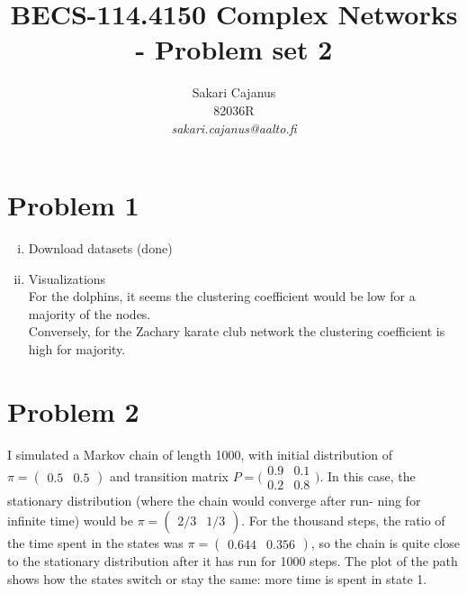 \documentclass[a4paper]{article}
\title{ BECS-114.4150 Complex Networks - Problem set 2}
\author{Sakari Cajanus\\ 82036R \\
       {\it sakari.cajanus@aalto.fi}}
\begin{document}
\maketitle


\newpage

\section*{Problem 1}
\begin{enumerate}[i)]
    \item Download datasets (done)
    \item Visualizations\\
        For the dolphins, it seems the clustering coefficient would be low for a majority of the nodes.\\
        Conversely, for the Zachary karate club network the clustering coefficient is high for majority.

        
\end{enumerate}
\clearpage
\section*{Problem 2}
I simulated a Markov chain of length 1000, with initial distribution of
$\pi = (\begin{smallmatrix} 0.5 & 0.5\end{smallmatrix})$ and transition matrix  $P = \bigl(\begin{smallmatrix} 0.9 &
0.1 \\ 0.2 & 0.8\end{smallmatrix}\bigr)$.
In this case, the stationary distribution (where the chain would converge after run-
ning for infinite time) would be $\pi = (\begin{smallmatrix} 2/3 & 1/3 \end{smallmatrix})$. For the thousand steps, the ratio of
the time spent in the states was $\pi = (\begin{smallmatrix}  0.644 & 0.356 \end{smallmatrix})$, so the chain is quite close to the
stationary distribution after it has run for 1000 steps. The plot of the path
shows how the states switch or stay the same: more time is spent in state 1.
\begin{figure}[ht]
    \centering
\end{figure}
\clearpage
\end{document}
